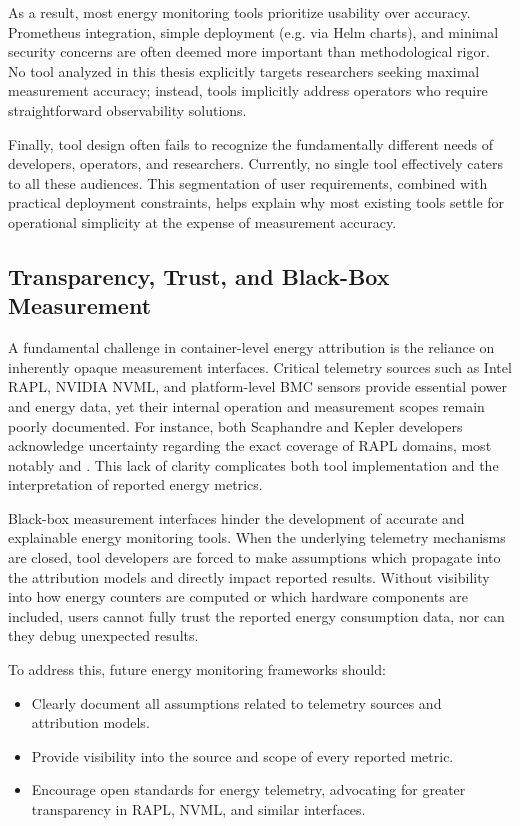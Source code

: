 As a result, most energy monitoring tools prioritize usability over accuracy. Prometheus integration, simple deployment (e.g. via Helm charts), and minimal security concerns are often deemed more important than methodological rigor. No tool analyzed in this thesis explicitly targets researchers seeking maximal measurement accuracy; instead, tools implicitly address operators who require straightforward observability solutions.

Finally, tool design often fails to recognize the fundamentally different needs of developers, operators, and researchers. Currently, no single tool effectively caters to all these audiences. This segmentation of user requirements, combined with practical deployment constraints, helps explain why most existing tools settle for operational simplicity at the expense of measurement accuracy.

\subsection{Transparency, Trust, and Black-Box Measurement}

A fundamental challenge in container-level energy attribution is the reliance on inherently opaque measurement interfaces. Critical telemetry sources such as Intel RAPL, NVIDIA NVML, and platform-level BMC sensors provide essential power and energy data, yet their internal operation and measurement scopes remain poorly documented. For instance, both Scaphandre and Kepler developers acknowledge uncertainty regarding the exact coverage of RAPL domains, most notably  and . This lack of clarity complicates both tool implementation and the interpretation of reported energy metrics.

Black-box measurement interfaces hinder the development of accurate and explainable energy monitoring tools. When the underlying telemetry mechanisms are closed, tool developers are forced to make assumptions which propagate into the attribution models and directly impact reported results. Without visibility into how energy counters are computed or which hardware components are included, users cannot fully trust the reported energy consumption data, nor can they debug unexpected results.

To address this, future energy monitoring frameworks should:
\begin{itemize}
    \item Clearly document all assumptions related to telemetry sources and attribution models.
    \item Provide visibility into the source and scope of every reported metric.
    \item Encourage open standards for energy telemetry, advocating for greater transparency in RAPL, NVML, and similar interfaces.
\end{itemize}

